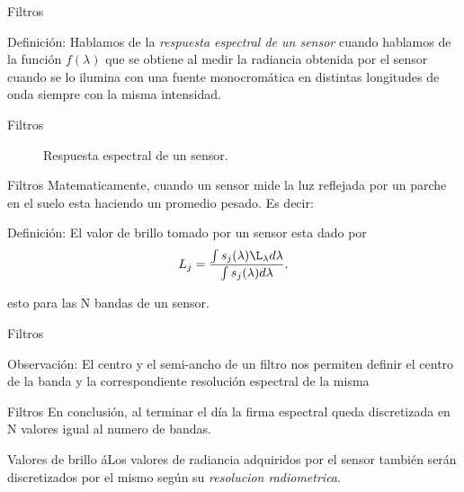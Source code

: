 \documentclass[handout,draft]{beamer}
\begin{document}
\begin{frame}{Filtros}
  \begin{block}{Definición:}
    Hablamos de la \emph{respuesta espectral de un sensor} cuando hablamos de la función $f(\lambda)$ que se obtiene al medir la radiancia obtenida por el sensor cuando se lo ilumina con una fuente monocromática en distintas longitudes de onda siempre con la misma intensidad.
  \end{block}
\end{frame}

\begin{frame}{Filtros}
  \begin{figure}
    \caption{Respuesta espectral de un sensor.}
  \end{figure}
\end{frame}

\begin{frame}{Filtros}
  Matematicamente, cuando un sensor mide la luz reflejada por un parche en el suelo esta haciendo un promedio pesado. Es decir:
  \begin{block}{Definición:}
    El valor de brillo tomado por un sensor esta dado por
    \begin{equation}
        L_{j} =\frac{\int s_j(\lambda) \L_\lambda d\lambda}{\int s_j(\lambda) d\lambda}.
    \end{equation}
  \end{block}
  esto para las N bandas de un sensor.
\end{frame}

\begin{frame}{Filtros}
  \begin{block}{Observación:}
    El centro y el semi-ancho de un filtro nos permiten definir el centro de la banda y la correspondiente resolución espectral de la misma
  \end{block}
  \begin{figure}
  \end{figure}
\end{frame}

\begin{frame}{Filtros}
  En conclusión, al terminar el día la firma espectral queda discretizada en N valores igual al numero de bandas.
\end{frame}

\begin{frame}{Valores de brillo}
  áLos valores de radiancia adquiridos por el sensor también serán discretizados por el mismo según su \emph{resolucion radiometrica}.
\end{frame}
\end{document}
